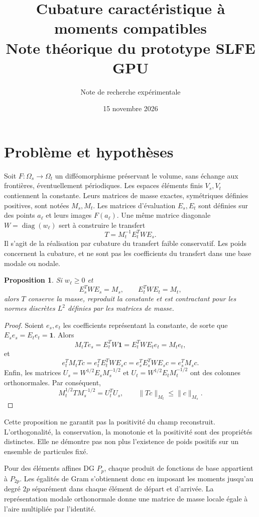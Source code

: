 \documentclass[11pt,a4paper]{article}
\title{Cubature caractéristique à moments compatibles\\Note théorique du prototype SLFE GPU}
\author{Note de recherche expérimentale}
\date{15 novembre 2026}
\newtheorem{proposition}{Proposition}
\begin{document}
\maketitle

\section{Problème et hypothèses}
Soit $F:\Omega_s\to\Omega_t$ un difféomorphisme préservant le volume,
sans échange aux frontières, éventuellement périodiques. Les espaces éléments
finis $V_s,V_t$ contiennent la constante. Leurs matrices de masse exactes,
symétriques définies positives, sont notées $M_s,M_t$. Les matrices
d'évaluation $E_s,E_t$ sont définies sur des points $a_\ell$ et leurs images
$F(a_\ell)$. Une même matrice diagonale $W=\operatorname{diag}(w_\ell)$
sert à construire le transfert
\[
 T=M_t^{-1}E_t^TWE_s.
\]
Il s'agit de la réalisation par cubature du transfert faible conservatif.
Les poids concernent la cubature, et ne sont pas les coefficients du transfert
dans une base modale ou nodale.

\begin{proposition}
Si $w_\ell\geq0$ et
\[
 E_s^TWE_s=M_s,\qquad E_t^TWE_t=M_t,
\]
alors $T$ conserve la masse, reproduit la constante et est contractant pour
les normes discrètes $L^2$ définies par les matrices de masse.
\end{proposition}
\begin{proof}
Soient $e_s,e_t$ les coefficients représentant la constante, de sorte que
$E_se_s=E_te_t=\mathbf1$. Alors
\[
 M_tTe_s=E_t^TW\mathbf1=E_t^TWE_te_t=M_te_t,
\]
et
\[
 e_t^TM_tTc=e_t^TE_t^TWE_sc
 =e_s^TE_s^TWE_sc=e_s^TM_sc.
\]
Enfin, les matrices $U_s=W^{1/2}E_sM_s^{-1/2}$ et
$U_t=W^{1/2}E_tM_t^{-1/2}$ ont des colonnes orthonormales. Par conséquent,
\[
 M_t^{1/2}TM_s^{-1/2}=U_t^TU_s,
 \qquad \|Tc\|_{M_t}\leq\|c\|_{M_s}.
\]
\end{proof}

Cette proposition ne garantit pas la positivité du champ reconstruit.
L'orthogonalité, la conservation, la monotonie et la positivité sont des
propriétés distinctes. Elle ne démontre pas non plus l'existence de poids
positifs sur un ensemble de particules fixé.

Pour des éléments affines DG $P_p$, chaque produit de fonctions de base
appartient à $P_{2p}$. Les égalités de Gram s'obtiennent donc en imposant
les moments jusqu'au degré $2p$ séparément dans chaque élément de départ
et d'arrivée. La représentation modale orthonormale donne une matrice de
masse locale égale à l'aire multipliée par l'identité.
\end{document}
